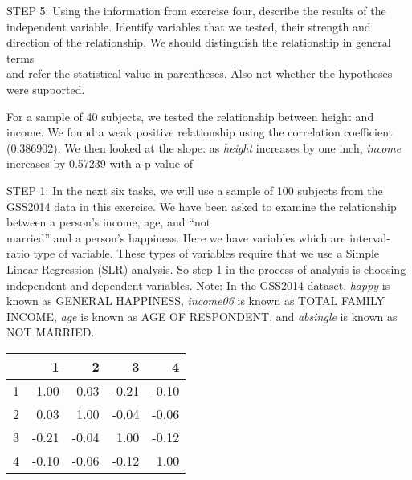 \documentclass[11pt]{book}\usepackage[]{graphicx}\usepackage[]{color}
\begin{document}
\begin{exercises}
\begin{solution}
    \end{solution}

      \begin{exercise} %


    STEP 5: Using the information from exercise four, describe the results of the independent variable.  Identify variables that we tested, their strength and direction of the relationship.  We should distinguish the relationship in general terms \\ and refer the statistical value in parentheses.  Also not whether the hypotheses were supported.

    \vspace{10mm}

    \end{exercise}
    \begin{solution}      %

    For a sample of 40 subjects, we tested the relationship between height and income.  We found a weak positive relationship using the correlation coefficient (0.386902).  We then looked at the slope:  as {\textit{height}} increases by one inch, {\textit{income}} increases by 0.57239 with a p-value of

    \end{solution}

  \begin{exercise} %

    STEP 1:  In the next six tasks, we will use a sample of 100 subjects from the GSS2014 data in this exercise.  We have been asked to examine the relationship between a person's income, age, and ``not \\ married'' and a person's happiness.  Here we have variables which are  interval-ratio type of variable.  These types of variables require that we use a Simple Linear Regression (SLR) analysis.  So step 1 in the process of analysis is choosing independent and dependent variables.  Note: In the GSS2014 dataset, {\textit{happy}} is known as GENERAL HAPPINESS, {\textit{income06}} is known as TOTAL FAMILY INCOME, {\textit{age}} is known as AGE OF RESPONDENT, and {\textit{absingle}} is known as NOT MARRIED.

{\small{
\begin{table}[ht]
\centering
\begin{tabular}{rrrrr}
  \hline
 & 1 & 2 & 3 & 4 \\ 
  \hline
1 & 1.00 & 0.03 & -0.21 & -0.10 \\ 
  2 & 0.03 & 1.00 & -0.04 & -0.06 \\ 
  3 & -0.21 & -0.04 & 1.00 & -0.12 \\ 
  4 & -0.10 & -0.06 & -0.12 & 1.00 \\ 
   \hline
\end{tabular}
\end{table}

}}
\end{exercise}
\end{exercises}
\end{document}
